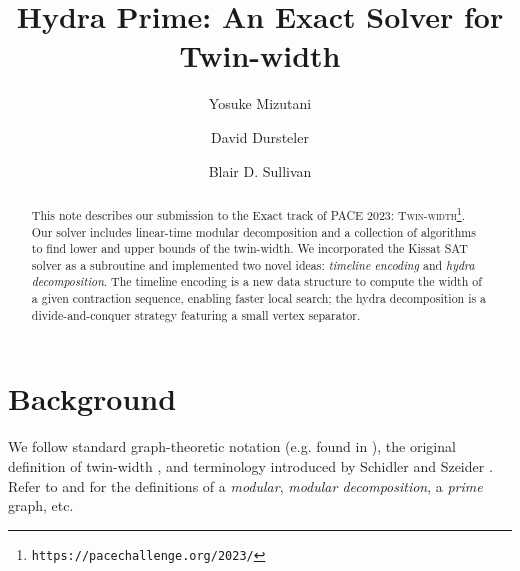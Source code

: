 \documentclass[a4paper,UKenglish,cleveref, autoref, thm-restate]{lipics-v2021}
\title{Hydra Prime: An Exact Solver for Twin-width} %
\author{Yosuke Mizutani}{\universityOfUtah}{yos@cs.utah.edu}{https://orcid.org/0000-0002-9847-4890}{}
\author{David Dursteler}{\universityOfUtah}{u1161522@utah.edu}{https://orcid.org/0009-0000-6471-1504}{}
\author{Blair D. Sullivan}{\universityOfUtah}{sullivan@cs.utah.edu}{https://orcid.org/0000-0001-7720-6208}{}
\begin{document}
\maketitle

\begin{abstract}
This note describes our submission to the Exact track of PACE 2023:
 \textsc{Twin-width}\footnote{%
\texttt{https://pacechallenge.org/2023/}}.
%
Our solver includes linear-time modular decomposition and
a collection of algorithms to find lower and upper bounds of the twin-width.
%
We incorporated the \textsf{Kissat} SAT solver \cite{biere_gimsatul_2022} as a subroutine
and implemented two novel ideas:
\emph{timeline encoding} and \emph{hydra decomposition}.
%
The timeline encoding is a new data structure to compute the width of a given contraction
sequence, enabling faster local search;
the hydra decomposition is a divide-and-conquer strategy featuring a small vertex separator.
\end{abstract}

\section{Background}
\label{sec:background}

We follow standard graph-theoretic notation (e.g. found in \cite{diestel2017graph}),
the original definition of twin-width \cite{bonnet_twin-width_2020,bonnet_twin-width_2021,
bonnet_twin-width_2021-1},
and terminology introduced by Schidler and Szeider \cite{schidler_sat_2021}.
%
Refer to \cite{habib_survey_2010} and \cite{tedder_simple_2008} for the definitions of
a \emph{modular}, \emph{modular decomposition}, a \emph{prime} graph, etc.
\end{document}
